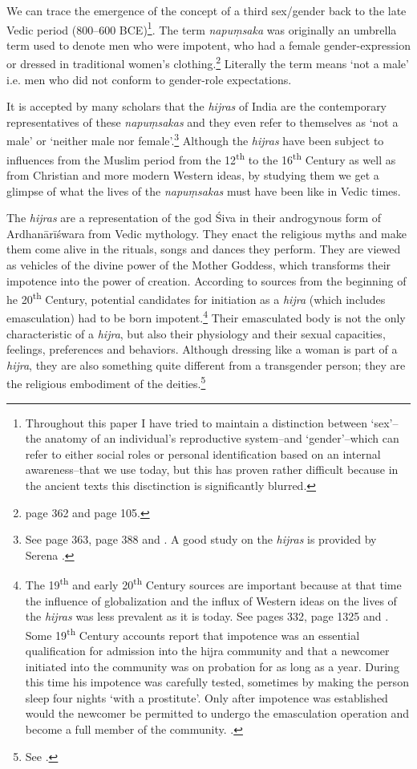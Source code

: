 We can trace the emergence of the concept of a third sex/gender back to the late Vedic period (800–600 BCE)\footnote{Throughout this paper I have tried to maintain a distinction between `sex'--the anatomy of an individual's reproductive system--and `gender'--which can refer to either social roles or personal identification based on an internal awareness--that we use today, but this has proven rather difficult because in the ancient texts this disctinction is significantly blurred.}. The term {\em napuṃsaka} was originally an umbrella term used to denote men who were impotent, who had a female gender-expression or dressed in traditional women's clothing.\footnote{\cite{zwilling} page 362 and \cite{zwilling2000} page 105.} Literally the term means `not a male' i.e. men who did not conform to gender-role expectations.

It is accepted by many scholars that the {\em hijras} of India are the contemporary representatives of these {\em napuṃsakas} and they even refer to themselves as `not a male' or `neither male nor female'.\footnote{See \cite{zwilling} page 363, \cite{goldman} page 388 and \cite{wendy}. A good study on the {\em hijras} is provided by Serena \cite{nanda}.} Although the {\em hijras} have been subject to influences from the Muslim period from the 12\textsuperscript{th} to the 16\textsuperscript{th} Century as well as from Christian and more modern Western ideas, by studying them we get a glimpse of what the lives of the {\em napuṃsakas} must have been like in Vedic times. 

The {\em hijras} are a representation of the god Śiva in their androgynous form of Ardhanārīśwara from Vedic mythology. They enact the religious myths and make them come alive in the rituals, songs and dances they perform. They are viewed as vehicles of the divine power of the Mother Goddess, which transforms their impotence into the power of creation. According to sources from the beginning of he 20\textsuperscript{th} Century, potential candidates for initiation as a {\em hijra} (which includes emasculation) had to be born impotent.\footnote{The 19\textsuperscript{th} and early 20\textsuperscript{th} Century sources are important because at that time the influence of globalization and the influx of Western ideas on the lives of the {\em hijras} was less prevalent as it is today. See \cite{ibbetson} pages 332, \cite{shah} page 1325 and \cite{bhimbhai}. Some 19\textsuperscript{th} Century accounts report that impotence was an essential qualification for admission into the hijra community and that a newcomer initiated into the community was on probation for as long as a year. During this time his impotence was carefully tested, sometimes by making the person sleep four nights `with a prostitute'. Only after impotence was established would the newcomer be permitted to undergo the emasculation operation and become a full member of the community. \cite{preston}.} Their emasculated body is not the only characteristic of a {\em hijra}, but also their physiology and their sexual capacities, feelings, preferences and behaviors. Although dressing like a woman is part of a {\em hijra}, they are also something quite different from a transgender person; they are the religious embodiment of the deities.\footnote{See \cite{nanda}.}


